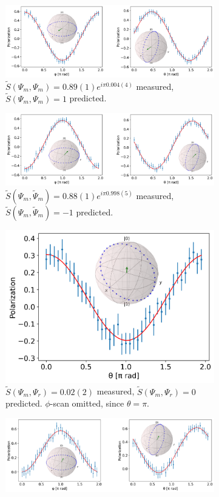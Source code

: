 \documentclass[two column]{article}
\begin{document}
\begin{figure}
    \centering
    \begin{subfigure}{\textwidth}
        \centering
        \includegraphics[width=0.7\linewidth]{Figures/flav_s_plus.pdf}
        \caption{$\tilde{S}(\Psi_m, \Psi_m) = 0.89(1) e^{i\pi 0.004(4)}$ measured, $\tilde S(\Psi_m, \Psi_m) = 1$ predicted.}
        \label{fig:flav_cond_res_plus}
    \end{subfigure}
        \begin{subfigure}{\textwidth}
        \centering
        \includegraphics[width=0.7\linewidth]{Figures/flav_s_minus.pdf}
        \caption{$\tilde{S}(\Psi_m, \tilde{\Psi}_m) = 0.88(1)e^{i\pi 0.998(5)}$ measured, $\tilde S(\Psi_m, \tilde{\Psi}_m) = -1$ predicted.}
        \label{fig:flav_cond_res_minus}
    \end{subfigure}
    \begin{subfigure}{\textwidth}
        \centering
        \includegraphics[width=0.35\linewidth]{Figures/flav_s_zero.pdf}
        \caption{$\tilde{S}(\Psi_m, \Psi_r) = 0.02(2)$ measured, $\tilde S(\Psi_m, \Psi_r) = 0$ predicted. $\phi$-scan omitted, since $\theta=\pi$.}
        \label{fig:flav_cond_res_zero}
    \end{subfigure}
        \begin{subfigure}{\textwidth}
     \centering
        \includegraphics[width=0.7\linewidth]{Figures/exist_s_minus.pdf}

\end{subfigure}
\end{figure}
\end{document}
